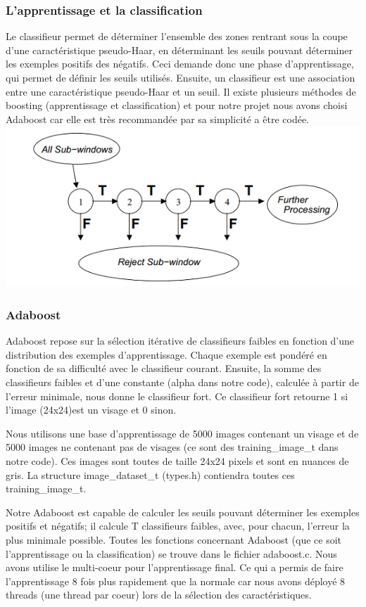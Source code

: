 \documentclass[12pt,a4paper]{article}
\begin{document}
\newpage
\subsubsection{L'apprentissage et la classification}
Le classifieur permet de déterminer l'ensemble des zones rentrant sous la coupe d'une caractéristique pseudo-Haar, en déterminant les seuils pouvant déterminer les exemples positifs des négatifs. Ceci demande donc une phase d'apprentissage, qui permet de définir les seuils utilisés. Ensuite, un classifieur est une association entre une caractéristique pseudo-Haar et un seuil. Il existe plusieurs méthodes de boosting (apprentissage et classification) et pour notre projet nous avons choisi Adaboost car elle est très recommandée par sa simplicité a être codée.
\vspace{0.8cm}
\includegraphics[scale=1]{Pictures/principe-cascade.png}

\newpage
\subsubsection{Adaboost}
Adaboost repose sur la sélection itérative de classifieurs faibles en fonction d'une distribution des exemples d'apprentissage. Chaque exemple est pondéré en fonction de sa difficulté avec le classifieur courant. Ensuite, la somme des classifieurs faibles et d'une constante (alpha dans notre code), calculée à partir de l'erreur minimale, nous donne le classifieur fort. Ce classifieur fort retourne 1 si l'image (24x24)est un visage et 0 sinon.

Nous utilisons une base d'apprentissage de 5000 images contenant un visage et de 5000 images ne contenant pas de visages (ce sont des training\_image\_t dans notre code). Ces images sont toutes de taille 24x24 pixels et sont en nuances de gris. La structure image\_dataset\_t (types.h) contiendra toutes ces training\_image\_t.

Notre Adaboost est capable de calculer les seuils pouvant déterminer les exemples positifs et négatifs; il calcule T classifieurs faibles, avec, pour chacun, l'erreur la plus minimale possible. Toutes les fonctions concernant Adaboost (que ce soit l'apprentissage ou la classification) se trouve dans le fichier adaboost.c.
Nous avons utilise le multi-coeur pour l'apprentissage final. Ce qui a permis de faire l'apprentissage 8 fois plus rapidement que la normale car nous avons déployé 8 threads (une thread par coeur) lors de la sélection des caractéristiques.
\end{document}
